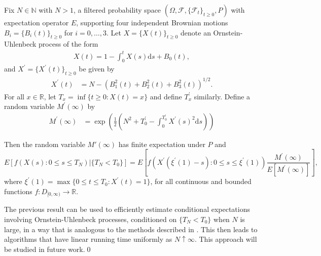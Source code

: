 \begin{theorem}
\label{T OU} Fix $N \in \mathbb{N}$ with $N>1$, a filtered probability space
$(\Omega, \mathcal{F}, \{\mathcal{F}_t\}_{t \geq 0}, P)$ with expectation
operator $E$, supporting four independent Brownian motions $B_i =
\{B_{i}(t)\}_{t\geq 0}$ for $i = 0, \ldots, 3$. Let $X=\{ X(t)\}_{t \geq 0}$ denote an Ornstein-Uhlenbeck process of the form
\begin{align*}
X( t) =1-\int_{0}^{t}X\left( s\right) \mathrm{d}s+B_0(t) ,
\end{align*}
and $X^{\prime }=\{ X^{\prime }(t)\}_{t \geq 0}$ be given by
\begin{align*} 
X^{\prime }( t) &=N-\left( B_{1}^{2}\left( t\right) +B_{2}^{2}\left(
t\right) +B_{3}^{2}\left( t\right) \right) ^{1/2}.
\end{align*}
For all $x \in {\mathbb{R}}$, let $T_x=\inf \{t\geq 0:X( t) =x\}$ and define
$T_x^{\prime }$ similarly. Define a random variable $M^{\prime }(\infty)$ by
\begin{align}  \label{eq:M'}
M^{\prime }\left( \infty \right) &=\exp \left( \frac{1}{2}\left(N^2 +
T_{0}^{\prime }-\int_{0}^{T_{0}^{\prime }}X^{\prime }\left( s\right) ^{2}%
\mathrm{d}s\right) \right)
\end{align}

Then the random variable $M'(\infty)$ has finite expectation under $P$ and
\begin{equation*}
E\left[ f\left( X\left( s\right) :0\leq s\leq T_{N}\right) |\{T_{N}<T_{0}\}%
\right] ={E}\left[ f\left( X^{\prime }\left( \xi ^{\prime }\left( 1\right)
-s\right) :0\leq s\leq \xi ^{\prime }\left( 1\right) \right) \frac{M^{\prime
}\left( \infty \right) }{E[M^{\prime }\left( \infty \right) ]}\right] ,
\end{equation*}%
where $\xi ^{\prime }\left( 1\right) =\max \{0\leq t\leq T_{0}:X^{\prime
}(t)=1\}$, for all continuous and
bounded functions  $f:D_{[0,\infty )}\rightarrow \mathbb{R}$.
\end{theorem}

\begin{remark}
The previous result can be used to efficiently estimate conditional
expectations involving Ornstein-Uhlenbeck processes, conditioned on $\{T_{N}<T_{0}\}$ when $N$ is large, in a way that is
analogous to the methods described in \citet{Blanchet2013}. This then  leads to
algorithms that have linear running time uniformly as $N\uparrow \infty $.
This approach will be studied
in future work.\qed
\end{remark}

